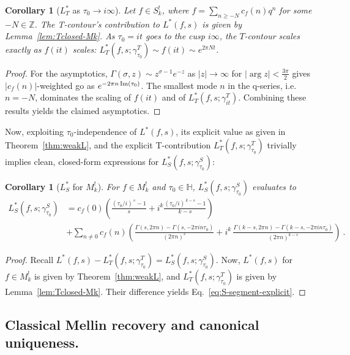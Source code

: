 \documentclass[11pt]{article}
\newtheorem{corollary}[theorem]{Corollary}
\newcommand{\HH}{\mathbb{H}}
\newcommand{\ZZ}{\mathbb{Z}}
\begin{document}
\begin{corollary}[$L^*_T$ as $\tau_0 \to i \infty$]\label{lem:cusp-decay}
Let $f \in S^!_k$, where $f = \sum_{n \geq -N} c_f(n)q^n$ for some $-N \in \ZZ$. 
The T-contour's contribution to $L^*(f,s)$ is given by 
Lemma~\ref{lem:Tclosed-Mk}. As $\tau_0 = it$ goes to the cusp $i\infty$,
the $T$-contour scales exactly as $f(it)$ scales:
$L_T^*(f, s; \gamma^T_{\tau_0}) \sim f(it) \sim e^{2\pi N t}$.
\end{corollary}
\begin{proof}
For the asymptotics, $\Gamma(\sigma, z) \sim z^{\sigma - 1}e^{-z}$
as $|z| \to \infty$ for $|\arg z| < \tfrac{3\pi}{2}$ \cite[\S8.11]{DLMF}
gives $|c_f(n)|$-weighted go as $e^{-2\pi n\,{\rm Im}(\tau_0)}$.  The smallest 
mode $n$ in the q-series, i.e. $n = -N$, dominates the scaling of $f(it)$ and of 
$L^*_T(f, s; \gamma^T_{i t})$. Combining these results yields the claimed asymptotics.
\end{proof}

Now, exploiting $\tau_0$-independence of $L^*(f, s)$, its explicit value as given in 
Theorem~\ref{thm:weakL}, and the explicit T-contribution $L^*_T(f, s; \gamma^T_{\tau_0})$ trivially 
implies clean, closed-form expressions for $L^*_S(f, s; \gamma^S_{\tau_0})$:

\begin{corollary}[$L^*_S$ for $M_k^!$]\label{cor:Sclosed}
For $f\in M^!_k$ and $\tau_0\in\HH$, 
$L^*_S(f, s; \gamma^S_{\tau_0})$ evaluates to
\begin{align}
L_S^*(f,s;\gamma^S_{\tau_0})
&= c_f(0)\left(\frac{(\tau_0/i)^{\,s}-1}{s}
+ i^k\frac{(\tau_0/i)^{\,k-s}-1}{k-s}\right) \label{eq:S-segment-explicit}\\
&+ \sum_{n\ne0} c_f(n)\!\left(\frac{\Gamma(s,2\pi n)-\Gamma(s,-2\pi i n\tau_0)}{(2\pi n)^s}
+ i^k\,\frac{\Gamma(k-s,2\pi n)-\Gamma(k-s,-2\pi i n\tau_0)}{(2\pi n)^{k-s}}\right)~. \nonumber
\end{align}
\end{corollary}
\begin{proof}
Recall $L^*(f, s) - L^*_T(f, s; \gamma^T_{\tau_0}) = L^*_S(f, s; \gamma^S_{\tau_0})$. 
Now, $L^*(f,s)$ for $f \in M_k^!$ is given by Theorem~\ref{thm:weakL}, and 
$L^*_T(f, s; \gamma^T_{\tau_0})$ is given by Lemma~\ref{lem:Tclosed-Mk}. 
Their difference yields Eq.~\eqref{eq:S-segment-explicit}.
\end{proof}


\subsection{Classical Mellin recovery and canonical uniqueness.}\label{sec:Connection-w-previous-weak-MF-l-functions}
\end{document}
